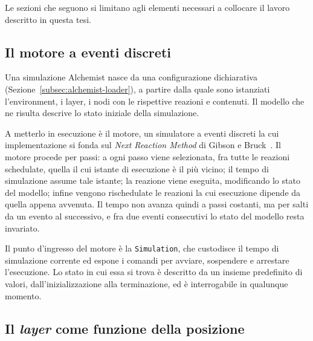 Le sezioni che seguono si limitano agli elementi necessari a collocare il lavoro
descritto in questa tesi.

\subsection{Il motore a eventi discreti}
\label{subsec:alchemist-lifecycle}

Una simulazione Alchemist nasce da una configurazione dichiarativa
(Sezione~\ref{subsec:alchemist-loader}), a partire dalla quale sono istanziati
l'environment, i layer, i nodi con le rispettive reazioni e contenuti. Il modello
che ne risulta descrive lo stato iniziale della simulazione.

A metterlo in esecuzione è il motore, un simulatore a eventi discreti la cui implementazione si
fonda sul \emph{Next Reaction Method} di Gibson e Bruck~\cite{gibson}. Il motore
procede per passi: a ogni passo viene selezionata, fra tutte le reazioni
schedulate, quella il cui istante di esecuzione è il più vicino; il tempo di simulazione
assume tale istante; la reazione viene eseguita, modificando lo stato del modello;
infine vengono rischedulate le reazioni la cui esecuzione dipende da quella appena
avvenuta. Il tempo non avanza quindi a passi costanti, ma per salti da un evento al
successivo, e fra due eventi consecutivi lo stato del modello resta invariato.

Il punto d'ingresso del motore è la \texttt{Simulation}, che custodisce il tempo di simulazione
corrente ed espone i comandi per avviare, sospendere e arrestare l'esecuzione. Lo stato
in cui essa si trova è descritto da un insieme predefinito di valori, dall'inizializzazione
alla terminazione, ed è interrogabile in qualunque momento.

\subsection{Il \emph{layer} come funzione della posizione}
\label{subsec:alchemist-layer}

